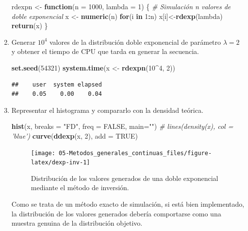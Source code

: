 \documentclass[
]{book}
\newenvironment{Shaded}{\begin{snugshade}}{\end{snugshade}}
\newcommand{\CommentTok}[1]{\textcolor[rgb]{0.56,0.35,0.01}{\textit{#1}}}
\newcommand{\ControlFlowTok}[1]{\textcolor[rgb]{0.13,0.29,0.53}{\textbf{#1}}}
\newcommand{\DataTypeTok}[1]{\textcolor[rgb]{0.13,0.29,0.53}{#1}}
\newcommand{\DecValTok}[1]{\textcolor[rgb]{0.00,0.00,0.81}{#1}}
\newcommand{\KeywordTok}[1]{\textcolor[rgb]{0.13,0.29,0.53}{\textbf{#1}}}
\newcommand{\NormalTok}[1]{#1}
\newcommand{\OperatorTok}[1]{\textcolor[rgb]{0.81,0.36,0.00}{\textbf{#1}}}
\newcommand{\OtherTok}[1]{\textcolor[rgb]{0.56,0.35,0.01}{#1}}
\newcommand{\StringTok}[1]{\textcolor[rgb]{0.31,0.60,0.02}{#1}}
\theoremstyle{break}
\theoremstyle{definition}
\theoremstyle{definition}
\theoremstyle{definition}
\theoremstyle{remark}
\begin{document}
\begin{enumerate}
\begin{Shaded}
\begin{Highlighting}[]
\NormalTok{rdexpn <-}\StringTok{ }\ControlFlowTok{function}\NormalTok{(}\DataTypeTok{n =} \DecValTok{1000}\NormalTok{, }\DataTypeTok{lambda =} \DecValTok{1}\NormalTok{) \{}
\CommentTok{# Simulación n valores de doble exponencial}
\NormalTok{    x <-}\StringTok{ }\KeywordTok{numeric}\NormalTok{(n)}
    \ControlFlowTok{for}\NormalTok{(i }\ControlFlowTok{in} \DecValTok{1}\OperatorTok{:}\NormalTok{n) x[i]<-}\KeywordTok{rdexp}\NormalTok{(lambda)}
    \KeywordTok{return}\NormalTok{(x)}
\NormalTok{\}}
\end{Highlighting}
\end{Shaded}
\item
  Generar \(10^{4}\) valores de la distribución doble exponencial de
  parámetro \(\lambda=2\) y obtener el tiempo de CPU que tarda en
  generar la secuencia.

\begin{Shaded}
\begin{Highlighting}[]
\KeywordTok{set.seed}\NormalTok{(}\DecValTok{54321}\NormalTok{)}
\KeywordTok{system.time}\NormalTok{(x <-}\StringTok{ }\KeywordTok{rdexpn}\NormalTok{(}\DecValTok{10}\OperatorTok{^}\DecValTok{4}\NormalTok{, }\DecValTok{2}\NormalTok{))}
\end{Highlighting}
\end{Shaded}

\begin{verbatim}
##    user  system elapsed 
##    0.05    0.00    0.04
\end{verbatim}
\item
  Representar el histograma y compararlo con la densidad teórica.

\begin{Shaded}
\begin{Highlighting}[]
\KeywordTok{hist}\NormalTok{(x, }\DataTypeTok{breaks =} \StringTok{"FD"}\NormalTok{, }\DataTypeTok{freq =} \OtherTok{FALSE}\NormalTok{, }\DataTypeTok{main=}\StringTok{""}\NormalTok{)}
\CommentTok{# lines(density(x), col = 'blue')}
\KeywordTok{curve}\NormalTok{(}\KeywordTok{ddexp}\NormalTok{(x, }\DecValTok{2}\NormalTok{), }\DataTypeTok{add =} \OtherTok{TRUE}\NormalTok{)}
\end{Highlighting}
\end{Shaded}

  \begin{figure}[!htb]

  {\centering \texttt{[image: 05-Metodos\_generales\_continuas\_files/figure-latex/dexp-inv-1]} 

  }

  \caption{Distribución de los valores generados de una doble exponencial mediante el método de inversión.}\label{fig:dexp-inv}
  \end{figure}

  Como se trata de un método exacto de simulación, si está bien implementado, la distribución de los valores generados debería comportarse como una muestra genuina de la distribución objetivo.
\end{enumerate}
\end{document}
